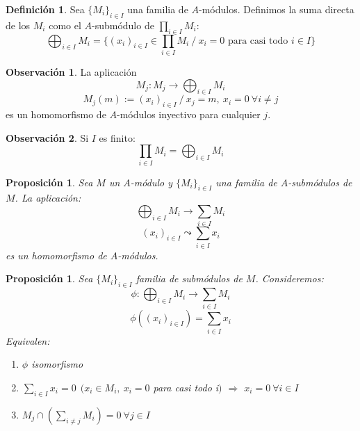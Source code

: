 \documentclass{article}
\theoremstyle{theorem-style}  %
\newtheorem{proposition}[theorem]{Proposición}
\theoremstyle{definition}
\newtheorem{definition}{Definición}[section]
\newtheorem*{observation}{Observación} %
\theoremstyle{example-style}
\begin{document}
	\begin{definition}
		Sea $\{M_i\}_{i\in I}$ una familia de $A$-módulos. Definimos la suma directa de los $M_i$ como el $A$-submódulo de $\prod_{i\in I}M_i$:
		\[\bigoplus_{i\in I}M_i=\{(x_i)_{i\in I} \in \prod_{i\in I}M_i \ / \ x_i=0 \text{ para casi todo } i \in I\}\]
	\end{definition}

	\begin{observation}
		La aplicación
		\[M_j:M_j\longrightarrow\bigoplus_{i\in I}M_i\]
		\[M_j(m):= (x_i)_{i\in I} \ / \ x_j=m,\  x_i=0 \ \forall i\neq j \]
		es un homomorfismo de $A$-módulos inyectivo para cualquier $j$.
	\end{observation}

	\begin{observation}
		Si $I$ es finito:
		\[\prod_{i\in I}M_i = \bigoplus_{i\in I}M_i \]
	\end{observation}

	\begin{proposition}
		Sea $M$ un $A$-módulo y $\{M_i\}_{i\in I}$ una familia de $A$-submódulos de $M$. La aplicación:
		\[ \bigoplus_{i\in I}M_i \longrightarrow \sum_{i\in I}M_i \]
		\[ (x_i)_{i\in I} \leadsto \sum_{i\in I}x_i \]
		es un homomorfismo de $A$-módulos.
	\end{proposition}

	\begin{proposition}
		Sea $ \{M_i\}_{i\in I} $ familia de submódulos de $ M $. Consideremos:
		\[\phi : \bigoplus_{i\in I} M_i\longrightarrow \sum_{i\in I }M_i \]
		\[\phi ((x_i)_{i\in I})=\sum_{i\in I} x_i \]
		Equivalen:
		\begin{enumerate}[\hspace{1cm}i)]
			\item $\phi$ isomorfismo
			\item $\sum_{i\in I}x_i=0 \ \  (x_i \in M_i, \ x_i=0$ para casi todo i$)$ $\Rightarrow$ $ x_i=0 \ \forall i \in I $
			\item $M_j \cap (\sum_{i\neq j}M_i) = 0 \ \forall j \in I$
		\end{enumerate}
	\end{proposition}
\end{document}
